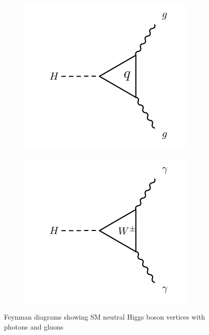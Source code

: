 \begin{figure}[!h]
\centering
\begin{subfigure}{0.4\textwidth}
   \includegraphics[width=\textwidth]{figures/hgg.pdf}
\caption{}
\label{fig:higgsVertmasslessBa}
\end{subfigure}%
\begin{subfigure}{0.4\textwidth}
   \includegraphics[width=\textwidth]{figures/hgamma.pdf}
\caption{}
\label{fig:higgsVertmasslessBb}
\end{subfigure}%
\caption{Feynman diagrams showing SM neutral Higgs boson vertices with photons and gluons}
\label{fig:higgsVertmasslessB}
\end{figure}

